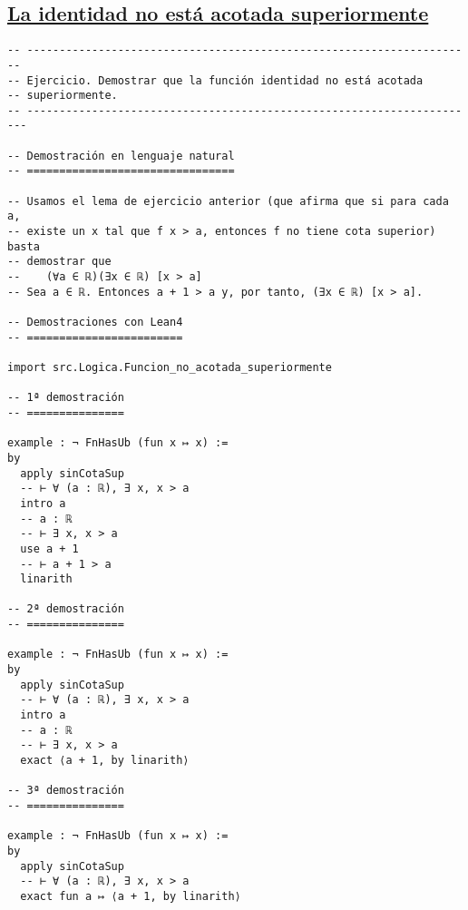\subsection{\href{./src/Logica/La\_identidad\_no\_esta\_acotada\_superiormente.lean}{La identidad no está acotada superiormente}}
\label{sec:org5c00bd6}
\begin{verbatim}
-- ---------------------------------------------------------------------
-- Ejercicio. Demostrar que la función identidad no está acotada
-- superiormente.
-- ----------------------------------------------------------------------

-- Demostración en lenguaje natural
-- ================================

-- Usamos el lema de ejercicio anterior (que afirma que si para cada a,
-- existe un x tal que f x > a, entonces f no tiene cota superior) basta
-- demostrar que
--    (∀a ∈ ℝ)(∃x ∈ ℝ) [x > a]
-- Sea a ∈ ℝ. Entonces a + 1 > a y, por tanto, (∃x ∈ ℝ) [x > a].

-- Demostraciones con Lean4
-- ========================

import src.Logica.Funcion_no_acotada_superiormente

-- 1ª demostración
-- ===============

example : ¬ FnHasUb (fun x ↦ x) :=
by
  apply sinCotaSup
  -- ⊢ ∀ (a : ℝ), ∃ x, x > a
  intro a
  -- a : ℝ
  -- ⊢ ∃ x, x > a
  use a + 1
  -- ⊢ a + 1 > a
  linarith

-- 2ª demostración
-- ===============

example : ¬ FnHasUb (fun x ↦ x) :=
by
  apply sinCotaSup
  -- ⊢ ∀ (a : ℝ), ∃ x, x > a
  intro a
  -- a : ℝ
  -- ⊢ ∃ x, x > a
  exact ⟨a + 1, by linarith⟩

-- 3ª demostración
-- ===============

example : ¬ FnHasUb (fun x ↦ x) :=
by
  apply sinCotaSup
  -- ⊢ ∀ (a : ℝ), ∃ x, x > a
  exact fun a ↦ ⟨a + 1, by linarith⟩
\end{verbatim}

